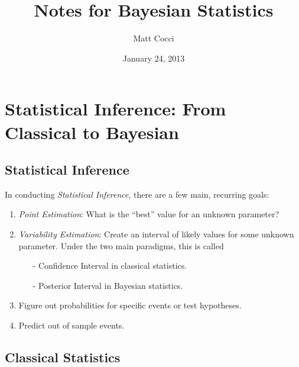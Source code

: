 \documentclass[a4paper,12pt]{scrartcl}
\author{Matt Cocci}
\title{Notes for Bayesian Statistics}
\date{January 24, 2013}
\begin{document}
\maketitle

\tableofcontents

\newpage
\section{Statistical Inference: From Classical to Bayesian}

\subsection{Statistical Inference}
In conducting \emph{Statistical Inference}, there are a few
main, recurring goals:
\begin{enumerate}
   \item{\emph{Point Estimation}: What is the ``best'' value
      for an unknown parameter?}
   \item{\emph{Variability Estimation}: Create an interval of
      likely values for some unknown parameter. Under the two
      main paradigms, this is called
      \begin{itemize}
	 \item[-]{Confidence Interval in classical statistics.}
	 \item[-]{Posterior Interval in Bayesian statistics.}
      \end{itemize}
   }
   \item{Figure out probabilities for specific events or
      test hypotheses.}
   \item{Predict out of sample events.}
\end{enumerate}

\subsection{Classical Statistics}
\end{document}
